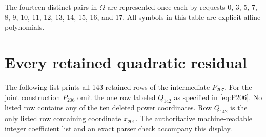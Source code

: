 \documentclass[11pt]{article}
\theoremstyle{definition}\newtheorem{definition}[theorem]{Definition}
\begin{document}
The fourteen distinct pairs in $\Omega$ are represented once each by
requests 0, 3, 5, 7, 8, 9, 10, 11, 12, 13, 14, 15, 16, and 17.
All symbols in this table are explicit affine polynomials.

\section{Every retained quadratic residual}\label{app:rows}

The following list prints all 143 retained rows of the intermediate
$P_{207}$. For the joint construction $P_{206}$ omit the one row labeled
$Q_{142}$ as specified in \eqref{eq:P206}. No listed row contains any of
the ten deleted power coordinates. Row $Q_{142}$ is the only listed
row containing coordinate $x_{201}$. The authoritative machine-readable
integer coefficient list and an exact parser check accompany this display.
\end{document}
